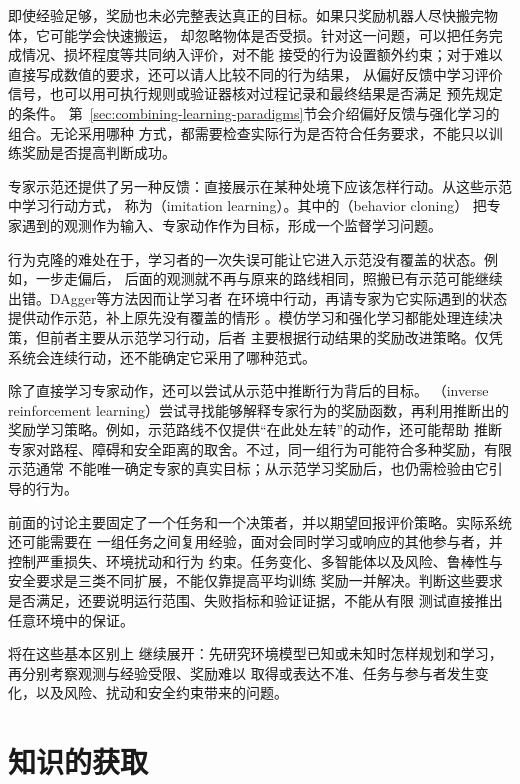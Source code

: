 即使经验足够，奖励也未必完整表达真正的目标。如果只奖励机器人尽快搬完物体，它可能学会快速搬运，
却忽略物体是否受损。针对这一问题，可以把任务完成情况、损坏程度等共同纳入评价，对不能
接受的行为设置额外约束；对于难以直接写成数值的要求，还可以请人比较不同的行为结果，
从偏好反馈中学习评价信号，也可以用可执行规则或验证器核对过程记录和最终结果是否满足
预先规定的条件。
第~\ref{sec:combining-learning-paradigms}节会介绍偏好反馈与强化学习的组合。无论采用哪种
方式，都需要检查实际行为是否符合任务要求，不能只以训练奖励是否提高判断成功。

专家示范还提供了另一种反馈：直接展示在某种处境下应该怎样行动。从这些示范中学习行动方式，
称为（imitation learning）。其中的（behavior cloning）
把专家遇到的观测作为输入、专家动作作为目标，形成一个监督学习问题。

行为克隆的难处在于，学习者的一次失误可能让它进入示范没有覆盖的状态。例如，一步走偏后，
后面的观测就不再与原来的路线相同，照搬已有示范可能继续出错。DAgger等方法因而让学习者
在环境中行动，再请专家为它实际遇到的状态提供动作示范，补上原先没有覆盖的情形
。模仿学习和强化学习都能处理连续决策，但前者主要从示范学习行动，后者
主要根据行动结果的奖励改进策略。仅凭系统会连续行动，还不能确定它采用了哪种范式。

除了直接学习专家动作，还可以尝试从示范中推断行为背后的目标。
（inverse reinforcement learning）尝试寻找能够解释专家行为的奖励函数，再利用推断出的
奖励学习策略。例如，示范路线不仅提供“在此处左转”的动作，还可能帮助
推断专家对路程、障碍和安全距离的取舍。不过，同一组行为可能符合多种奖励，有限示范通常
不能唯一确定专家的真实目标；从示范学习奖励后，也仍需检验由它引导的行为。

前面的讨论主要固定了一个任务和一个决策者，并以期望回报评价策略。实际系统还可能需要在
一组任务之间复用经验，面对会同时学习或响应的其他参与者，并控制严重损失、环境扰动和行为
约束。任务变化、多智能体以及风险、鲁棒性与安全要求是三类不同扩展，不能仅靠提高平均训练
奖励一并解决。判断这些要求是否满足，还要说明运行范围、失败指标和验证证据，不能从有限
测试直接推出任意环境中的保证。

将在这些基本区别上
继续展开：先研究环境模型已知或未知时怎样规划和学习，再分别考察观测与经验受限、奖励难以
取得或表达不准、任务与参与者发生变化，以及风险、扰动和安全约束带来的问题。

\section{知识的获取}
\label{sec:efficient-knowledge-use-overview}


